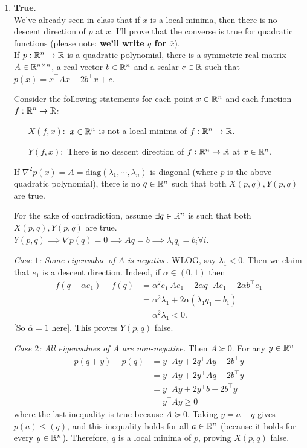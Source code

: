 \begin{enumerate}[leftmargin=*]
\item \textbf{True}.\\
We've already seen in class that if $\overline x$ is a local minima, then there is no descent direction of $p$ at $\overline x$. I'll prove that the converse is true for quadratic functions (please note: \textbf{we'll write $q$ for $\overline x$}). \\
If $p:\mathbb{R}^n\to \mathbb{R}$ is a quadratic polynomial, there is a symmetric real matrix $A\in \mathbb{R}^{n\times n}$, a real vector $b\in\mathbb{R}^n$ and a scalar $c\in \mathbb{R}$ such that $p(x) = x^\top Ax - 2b^\top x + c$. 

Consider the following statements for each point $x\in \mathbb{R}^n$ and each function $f:\mathbb{R}^n\to \mathbb{R}$:
\begin{itemize}[leftmargin=1in]
\item[$X(f,x):$] $x\in\mathbb{R}^n$ is not a local minima of $f:\mathbb{R}^n\to \mathbb{R}$.
\item[$Y(f,x):$] There is no descent direction of $f:\mathbb{R}^n\to \mathbb{R}$ at $x\in\mathbb{R}^n$.
\end{itemize}

\begin{lemma}\label{diag}
If $\nabla^2 p(x) = A = \text{diag}(\lambda_1,\cdots,\lambda_n)$ is diagonal (where $p$ is the above quadratic polynomial), there is no $q\in\mathbb{R}^n$ such that both $X(p,q),Y(p,q)$ are true.
\end{lemma}
\begin{pf}
For the sake of contradiction, assume $\exists q\in\mathbb{R}^n$ is such that both $X(p,q),Y(p,q)$ are true. $Y(p,q)\implies \nabla p(q) = 0\implies Aq=b\implies \lambda_iq_i=b_i\forall i$.

\textit{Case $1$: Some eigenvalue of $A$ is negative.} WLOG, say $\lambda_1<0$. Then we claim that $e_1$ is a descent direction. Indeed, if $\alpha\in (0,1)$ then \begin{align*}
f(q+\alpha e_1)-f(q) &= \alpha^2 e_1^\top Ae_1 + 2\alpha q^\top Ae_1 - 2\alpha b^\top e_1 \\
&= \alpha^2 \lambda_1 + 2\alpha(\lambda_1 q_1 - b_1) \\
&= \alpha^2 \lambda_1 < 0.\end{align*}
[So $\overline \alpha=1$ here]. This proves $Y(p,q)$ false.

\textit{Case $2$: All eigenvalues of $A$ are non-negative.} Then $A\succeq 0$. For any $y\in\mathbb{R}^n$
\begin{align*}
p(q+y)-p(q) &= y^\top A y + 2q^\top Ay -2b^\top y \\
&= y^\top A y + 2y^\top Aq -2b^\top y \\
&= y^\top A y + 2y^\top b -2b^\top y \\
&= y^\top Ay \geq 0\end{align*} where the last inequality is true because $A\succeq 0.$
Taking $y=a-q$ gives $p(a)\leq (q)$, and this inequality holds for all $a\in\mathbb{R}^n$ (because it holds for every $y\in\mathbb{R}^n$). Therefore, $q$ is a local minima of $p$, proving $X(p,q)$ false.


\end{pf}
\end{enumerate}
